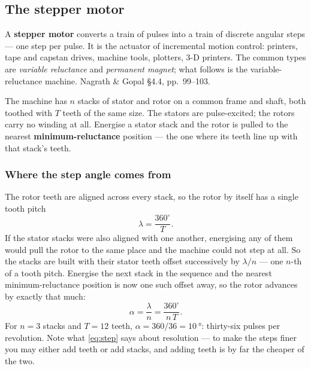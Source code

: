 \documentclass[11pt,a4paper]{article}
\begin{document}
\subsection{The stepper motor}

A \textbf{stepper motor} converts a train of pulses into a train of discrete
angular steps --- one step per pulse. It is the actuator of incremental motion
control: printers, tape and capstan drives, machine tools, plotters, 3-D
printers. The common types are \emph{variable reluctance} and \emph{permanent
magnet}; what follows is the variable-reluctance machine. Nagrath \& Gopal
\S4.4, pp.~99--103.

The machine has $n$ stacks of stator and rotor on a common frame and shaft,
both toothed with $T$ teeth of the same size. The stators are pulse-excited;
the rotors carry no winding at all. Energise a stator stack and the rotor is
pulled to the nearest \textbf{minimum-reluctance} position --- the one where
its teeth line up with that stack's teeth.

\subsubsection{Where the step angle comes from}

The rotor teeth are aligned across every stack, so the rotor by itself has a
single tooth pitch
\[
  \lambda=\frac{360^\circ}{T} .
\]
If the stator stacks were also aligned with one another, energising any of them
would pull the rotor to the same place and the machine could not step at all.
So the stacks are built with their stator teeth offset successively by
$\lambda/n$ --- one $n$-th of a tooth pitch. Energise the next stack in the
sequence and the nearest minimum-reluctance position is now one such offset
away, so the rotor advances by exactly that much:
\begin{equation}
  \alpha=\frac{\lambda}{n}=\frac{360^\circ}{n\,T} .
  \label{eq:step}
\end{equation}
For $n=3$ stacks and $T=12$ teeth, $\alpha=360/36=\SI{10}{\degree}$: thirty-six
pulses per revolution. Note what \eqref{eq:step} says about resolution --- to
make the steps finer you may either add teeth or add stacks, and adding teeth
is by far the cheaper of the two.
\end{document}
